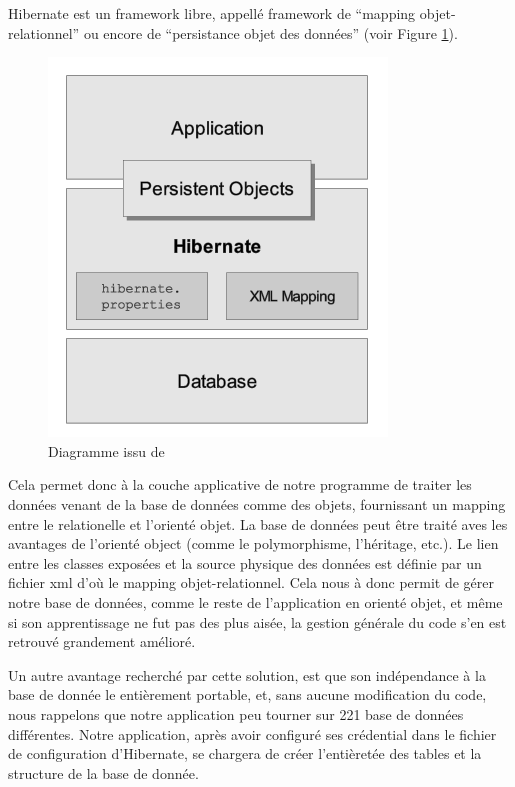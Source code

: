 Hibernate est un framework libre, appellé framework de  \enquote{mapping objet-relationnel} ou encore de \enquote{persistance objet des données} (voir Figure \ref{reference2}). 
\begin{figure}[!h]
    \center
   	\includegraphics[scale=0.65]{schema_hibernate.png}
   	\caption{Diagramme issu de\url{}}
    \label{reference2}
\end{figure}
Cela permet donc à la couche applicative de notre programme de traiter les données venant de la base de données comme des objets, fournissant un mapping entre le relationelle et l'orienté objet. La base de données peut être traité aves les avantages de l'orienté object (comme le polymorphisme, l'héritage, etc.). Le lien entre les classes exposées et la source physique des données  est définie par un fichier xml d'où le mapping objet-relationnel.
Cela nous à donc permit de gérer notre base de données, comme le reste de l'application en orienté objet, et même si son apprentissage ne fut pas des plus aisée, la gestion générale du code s'en est retrouvé grandement amélioré.

Un autre avantage recherché par cette solution, est que son indépendance à la base de donnée le entièrement portable, et, sans aucune modification du code, nous rappelons que notre application peu tourner sur 221 base de données différentes.  Notre application, après avoir configuré ses crédential dans le fichier de configuration d'Hibernate, se chargera de créer l'entièretée des tables et la structure de la base de donnée.

